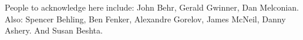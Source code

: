 

\clearpage
\begin{acknowledgement}
People to acknowledge here include:  John Behr, Gerald Gwinner, Dan Melconian.  Also:  Spencer Behling, Ben Fenker, Alexandre Gorelov, James McNeil, Danny Ashery.  And Susan Beshta.
\end{acknowledgement}
